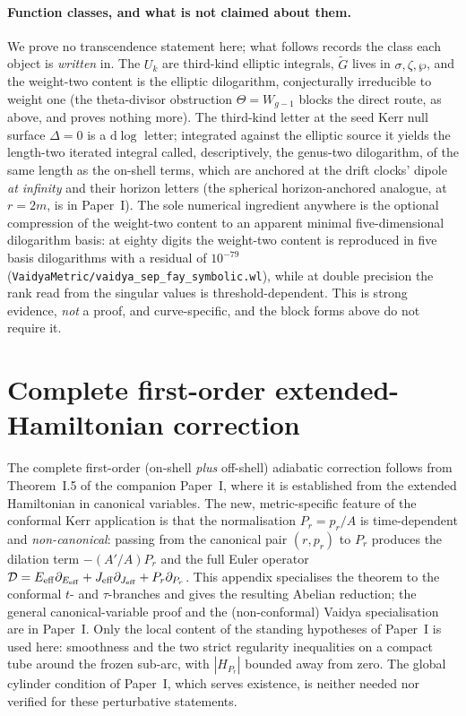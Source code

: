 \documentclass[12pt]{iopart}
\theoremstyle{plain}
\theoremstyle{definition}
\theoremstyle{remark}
\newcommand{\dd}{\mathrm{d}}
\begin{document}
\paragraph{Function classes, and what is not claimed about them.}
We prove no transcendence statement here; what follows records the class each
object is \emph{written} in. The $U_k$ are third-kind elliptic integrals, $\tilde G$
lives in $\sigma,\zeta,\wp$, and the weight-two content is the elliptic dilogarithm,
conjecturally irreducible to weight one (the theta-divisor obstruction
$\Theta=W_{g-1}$ blocks the direct route, as above, and proves nothing more). The
third-kind letter at the seed Kerr null surface $\Delta=0$ is a $\dd\log$ letter;
integrated against the elliptic source it yields the length-two iterated integral
called, descriptively, the genus-two dilogarithm, of the same length as the on-shell
terms, which are anchored at the drift clocks' dipole \emph{at infinity} and
their horizon letters (the spherical horizon-anchored analogue, at $r=2m$, is in
Paper~I). The sole
numerical ingredient anywhere is the optional compression of the weight-two content to
an apparent minimal five-dimensional dilogarithm basis: at eighty digits the
weight-two content is reproduced in five basis dilogarithms with a residual of
$10^{-79}$ (\texttt{VaidyaMetric/vaidya\_sep\_fay\_symbolic.wl}), while at double
precision the rank read from the singular values is threshold-dependent. This is
strong evidence, \emph{not} a proof, and curve-specific, and the block forms above do
not require it.

\clearpage
\section{Complete first-order extended-Hamiltonian correction}
\label{app:firstorder}
The complete first-order (on-shell \emph{plus} off-shell) adiabatic correction follows
from Theorem~I.5 of the companion Paper~I, where it is established from the extended
Hamiltonian in canonical variables. The new, metric-specific feature of the conformal
Kerr application is that the normalisation $P_r=p_r/A$ is time-dependent and
\emph{non-canonical}: passing from the canonical pair $(r,p_r)$ to $P_r$ produces the
dilation term $-(A'/A)P_r$ and the full Euler operator
$\mathcal D=E_{\rm eff}\partial_{E_{\rm eff}}+J_{\rm eff}\partial_{J_{\rm eff}}+P_r
\partial_{P_r}$. This appendix specialises the theorem to the conformal $t$- and
$\tau$-branches and gives the resulting Abelian reduction; the general canonical-variable
proof and the (non-conformal) Vaidya specialisation are in Paper~I. Only the local content of the standing hypotheses of Paper~I is used here:
smoothness and the two strict regularity inequalities on a compact tube around the frozen
sub-arc, with $|H_{P_r}|$ bounded away from zero. The global cylinder condition of Paper~I,
which serves existence, is neither needed nor verified for these perturbative statements.
\end{document}
